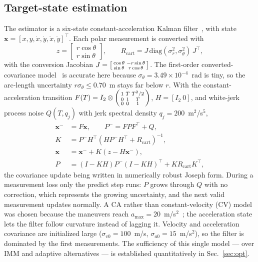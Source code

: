 \documentclass[conference]{IEEEtran}
\begin{document}
\subsection{Target-state estimation}\label{sec:est}
The estimator is a six-state constant-acceleration Kalman filter~\cite{kalman,barshalom}, with state $\mathbf{x}=[x,y,\dot x,\dot y,\ddot x,\ddot y]^\top$. Each polar measurement is converted with
\begin{equation}
z=\begin{bmatrix}r\cos\theta\\ r\sin\theta\end{bmatrix},\qquad
R_{\mathrm{cart}}=J\,\mathrm{diag}(\sigma_r^2,\sigma_\theta^2)\,J^\top,
\end{equation}
with the conversion Jacobian $J=\begin{bsmallmatrix}\cos\theta & -r\sin\theta\\ \sin\theta & r\cos\theta\end{bsmallmatrix}$.
The first-order converted-covariance model~\cite{lerro} is accurate here because $\sigma_\theta=3.49\times10^{-4}$~rad is tiny, so the arc-length uncertainty $r\sigma_\theta\le0.70$~m stays far below $r$. With the constant-acceleration transition $F(T)=I_2\otimes\begin{psmallmatrix}1&T&T^2/2\\0&1&T\\0&0&1\end{psmallmatrix}$, $H=[I_2\ 0]$, and white-jerk process noise $Q(T,q_j)$ with jerk spectral density $q_j=200$~m$^2$/s$^5$,
\begin{align}
\mathbf{x}^-&=F\mathbf{x},\qquad P^-=FPF^\top+Q,\\
K&=P^-H^\top(HP^-H^\top+R_{\mathrm{cart}})^{-1},\\
\mathbf{x}&=\mathbf{x}^-+K(z-H\mathbf{x}^-),\\
P&=(I-KH)P^-(I-KH)^\top+KR_{\mathrm{cart}}K^\top,
\end{align}
the covariance update being written in numerically robust Joseph form. During a measurement loss only the predict step runs: $P$ grows through $Q$ with no correction, which represents the growing uncertainty, and the next valid measurement updates normally. A CA rather than constant-velocity (CV) model was chosen because the maneuvers reach $a_{\max}=20$~m/s$^2$~\cite{li}; the acceleration state lets the filter follow curvature instead of lagging it. Velocity and acceleration covariance are initialized large ($\sigma_{v0}=100$~m/s, $\sigma_{a0}=15$~m/s$^2$), so the filter is dominated by the first measurements. The sufficiency of this single model --- over IMM and adaptive alternatives --- is established quantitatively in Sec.~\ref{sec:opt}.
\end{document}
